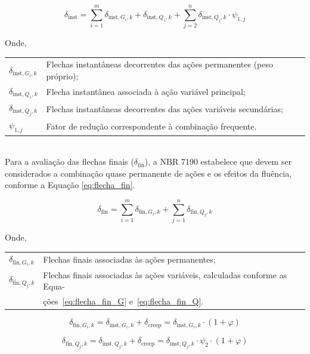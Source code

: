 \begin{quadro}[htpb!]
\begin{equation}
\delta_{\mathrm{inst}} =
\sum_{i=1}^{m} \delta_{\mathrm{inst},G_i,k}
+ \delta_{\mathrm{inst},Q_1,k}
+ \sum_{j=2}^{n} \delta_{\mathrm{inst},Q_j,k} \cdot \psi_{1,j}
\label{eq:flecha_inst}
\end{equation}

Onde,

\begin{tabular}{ll}
$\delta_{\mathrm{inst},G_i,k}$ & Flechas instantâneas decorrentes das ações permanentes (peso próprio);\\
$\delta_{\mathrm{inst},Q_1,k}$ & Flecha instantânea associada à ação variável principal;\\
$\delta_{\mathrm{inst},Q_j,k}$ & Flechas instantâneas decorrentes das ações variáveis secundárias;\\
$\psi_{1,j}$ & Fator de redução correspondente à combinação frequente.
\end{tabular}
\\

Para a avaliação das flechas finais ($\delta_{\mathrm{fin}}$), a NBR 7190 \parencite{NBR7190-1:2022} estabelece que devem ser considerados a combinação quase permanente de ações e os efeitos da fluência, conforme a Equação \eqref{eq:flecha_fin}.

\begin{equation}
\delta_{\mathrm{fin}} =
\sum_{i=1}^{m} \delta_{\mathrm{fin},G_i,k}
+ \sum_{j=1}^{n} \delta_{\mathrm{fin},Q_j,k}
\label{eq:flecha_fin}
\end{equation}

Onde,

\begin{tabular}{ll}
$\delta_{\mathrm{fin},G_i,k}$ & Flechas finais associadas às ações permanentes;\\
$\delta_{\mathrm{fin},Q_j,k}$ & Flechas finais associadas às ações variáveis, calculadas conforme as Equa-\\ 
& ções~\eqref{eq:flecha_fin_G} e~\eqref{eq:flecha_fin_Q}.
\end{tabular}


\begin{equation}
\delta_{\mathrm{fin},G_i,k}
=
\delta_{\mathrm{inst},G_i,k}
+ \delta_{\mathrm{creep}}
=
\delta_{\mathrm{inst},G_i,k} \cdot (1 + \varphi)
\label{eq:flecha_fin_G}
\end{equation}

\begin{equation}
\delta_{\mathrm{fin},Q_j,k}
=
\delta_{\mathrm{inst},Q_j,k}
+ \delta_{\mathrm{creep}}
=
\delta_{\mathrm{inst},Q_j,k} \cdot \psi_{2} \cdot (1 + \varphi)
\label{eq:flecha_fin_Q}
\end{equation}


\end{quadro}
